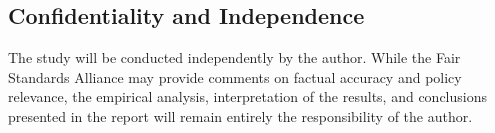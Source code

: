 \documentclass[12pt]{article}
\begin{document}
\medskip




\subsection*{Confidentiality and Independence}

The study will be conducted independently by the author. While the Fair Standards Alliance may provide comments on factual accuracy and policy relevance, the empirical analysis, interpretation of the results, and conclusions presented in the report will remain entirely the responsibility of the author.
\end{document}
